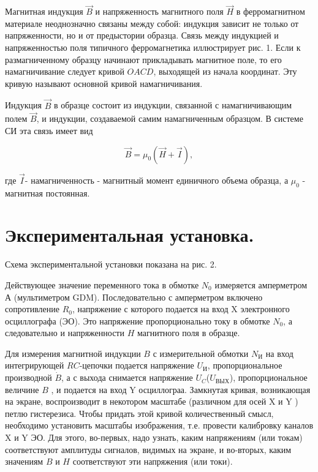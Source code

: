 \documentclass[a4paper,12pt]{article} %
\begin{document}
	Магнитная индукция $\vec{B}$ и напряженность магнитного поля
	$\vec{H}$ в ферромагнитном материале неоднозначно связаны
	между собой: индукция зависит не только от напряженности, но
	и от предыстории образца. Связь между индукцией
	и напряженностью поля типичного ферромагнетика иллюстрирует рис. 1. Если
	к размагниченному образцу начинают прикладывать магнитное поле, то его намагничивание следует кривой $ OACD $, выходящей
	из начала
	координат. Эту кривую называют основной кривой намагничивания.
	
	
	Индукция $\vec{B}$ в образце состоит из индукции, связанной с намагничивающим полем
	$\vec{B}$, и индукции, создаваемой самим намагниченным
	образцом.
	В системе СИ эта связь имеет вид
	
	$$\vec{B} = \mu_{0}(\vec{H}+\vec{I}),$$
	
\noindent	где $\vec{I}$- намагниченность - магнитный момент единичного объема образца, а $\mu_{0}$ - магнитная постоянная.

\newpage
\section*{Экспериментальная установка.}
Схема экспериментальной установки показана на рис. 2.

Действующее значение переменного тока в обмотке $N_0$ измеряется амперметром А (мультиметром GDM). Последовательно с амперметром включено сопротивление $R_{0}$, напряжение с которого подается на вход X электронного осциллографа (ЭО). Это напряжение пропорционально току в обмотке $N_{0}$, а следовательно и напряженности $H$ магнитного поля в образце.

Для измерения магнитной индукции $B$ с измерительной обмотки $N_{И}$ на вход интегрирующей $RC$-цепочки подается напряжение $U_{\text{И}}$, пропорциональное производной $\dot{B}$, а с выхода снимается напряжение $U_{C}$($U_{\text{ВЫХ}}$), пропорциональное величине $B$ , и подается на вход Y осциллограа.
Замкнутая кривая, возникающая на экране, воспроизводит в некотором масштабе (различном для осей X и Y ) петлю гистерезиса. Чтобы придать этой кривой количественный смысл, необходимо установить масштабы изображения, т.е. провести калибровку каналов X и Y ЭО. Для этого, во-первых, надо узнать, каким напряжениям (или токам) соответствуют амплитуды сигналов, видимых на экране, и во-вторых,  каким значениям $B$ и $H$ соответствуют эти напряжения (или токи).
\end{document}
